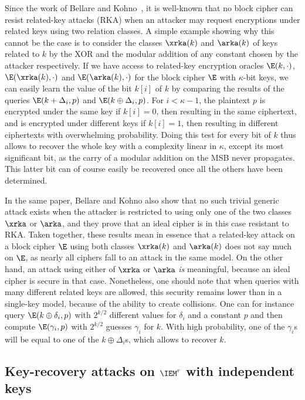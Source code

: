 Since the work of Bellare and Kohno~\cite{BK03}, it is well-known that no block cipher can resist
related-key attacks (RKA) when an attacker may request encryptions under related keys
using two relation classes. A simple example showing why this cannot be the case
is to consider the classes $\xrka(k)$ and $\arka(k)$ of keys
related to $k$ by the XOR and the modular addition of any constant chosen by the attacker respectively.
If we have access to related-key encryption oracles
$\E(k,\cdot)$, $\E(\xrka(k),\cdot)$ and $\E(\arka(k),\cdot)$ for the block cipher $\E$ with $\kappa$-bit keys,
we can easily learn the value of the bit $k[i]$ of $k$ by comparing the results of the queries
$\E(k + \Delta_i, p)$
and $\E(k \oplus \Delta_i, p)$. For $i < \kappa - 1$, the plaintext
$p$ is encrypted under the same key if
$k[i] = 0$, then resulting in the same ciphertext, and is
encrypted under different keys if $k[i] = 1$, then resulting in different ciphertexts
with overwhelming probability.
Doing this test for every bit of $k$ thus allows to recover the whole key
with a complexity linear in $\kappa$, except its most significant bit, as
the carry of a modular addition on the MSB never propagates.%
This latter bit can of course easily be recovered once all the others have been determined.

In the same paper, Bellare and Kohno also show that no such trivial generic attack exists when
the attacker is restricted to using
only one of the two classes $\xrka$ or $\arka$, and they prove that an ideal
cipher is in this case resistant to RKA. Taken together, these results mean in essence
that a related-key attack on a block cipher $\E$ using both classes $\xrka(k)$ and $\arka(k)$ does not say
much on $\E$, as nearly all ciphers fall to an attack
in the same model. On the other hand, an attack using either of $\xrka$ or $\arka$ \emph{is} meaningful,
because an ideal cipher is secure in that case.
Nonetheless, one should note that when
queries with many different related keys are allowed, this security remains lower than in a single-key model,
because of the ability to create collisions. One can
for instance query $\E(k\oplus\delta_i,p)$ with $2^{k/2}$ different values for $\delta_i$ and a constant $p$
and then compute $\E(\gamma_i,p)$ with $2^{k/2}$ guesses $\gamma_i$ for $k$. With high probability, one
of the $\gamma_i$s will be equal to one of the $k\oplus\Delta_i$s, which allows to recover $k$.

\subsection{Key-recovery attacks on $\IEM^r$ with independent keys}

